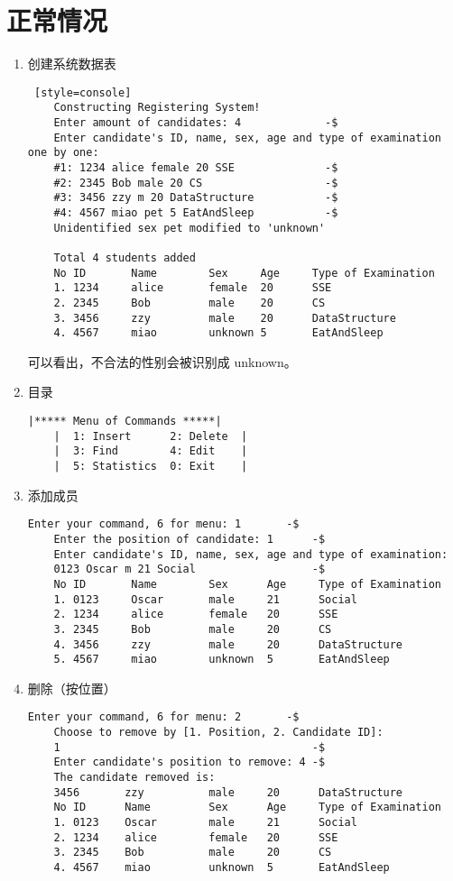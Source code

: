 \section{正常情况}
\begin{enumerate}
    \item 创建系统数据表
\begin{lstlisting} [style=console]
    Constructing Registering System!
    Enter amount of candidates: 4             -$
    Enter candidate's ID, name, sex, age and type of examination one by one: 
    #1: 1234 alice female 20 SSE              -$
    #2: 2345 Bob male 20 CS                   -$
    #3: 3456 zzy m 20 DataStructure           -$
    #4: 4567 miao pet 5 EatAndSleep           -$
    Unidentified sex pet modified to 'unknown'
    
    Total 4 students added
    No ID       Name        Sex     Age     Type of Examination
    1. 1234     alice       female  20      SSE
    2. 2345     Bob         male    20      CS
    3. 3456     zzy         male    20      DataStructure
    4. 4567     miao        unknown 5       EatAndSleep
\end{lstlisting}
可以看出，不合法的性别会被识别成 unknown。

    \item 目录
\begin{lstlisting}[style=console]
    |***** Menu of Commands *****|
    |  1: Insert      2: Delete  |
    |  3: Find        4: Edit    |
    |  5: Statistics  0: Exit    |
\end{lstlisting}

    \item 添加成员
\begin{lstlisting}[style=console]
    Enter your command, 6 for menu: 1       -$
    Enter the position of candidate: 1      -$
    Enter candidate's ID, name, sex, age and type of examination: 
    0123 Oscar m 21 Social                  -$
    No ID       Name        Sex      Age     Type of Examination
    1. 0123     Oscar       male     21      Social
    2. 1234     alice       female   20      SSE
    3. 2345     Bob         male     20      CS
    4. 3456     zzy         male     20      DataStructure
    5. 4567     miao        unknown  5       EatAndSleep
\end{lstlisting}

    \item 删除（按位置）
\begin{lstlisting}[style=console]
    Enter your command, 6 for menu: 2       -$
    Choose to remove by [1. Position, 2. Candidate ID]: 
    1                                       -$
    Enter candidate's position to remove: 4 -$
    The candidate removed is: 
    3456       zzy          male     20      DataStructure
    No ID      Name         Sex      Age     Type of Examination
    1. 0123    Oscar        male     21      Social
    2. 1234    alice        female   20      SSE
    3. 2345    Bob          male     20      CS
    4. 4567    miao         unknown  5       EatAndSleep
\end{lstlisting}


\end{enumerate}

